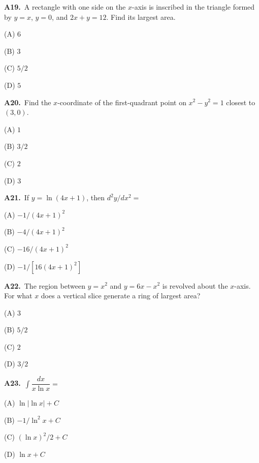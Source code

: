\documentclass[11pt]{article}
\begin{document}
\bigskip\noindent\textbf{A19.}\ A rectangle with one side on the $x$-axis is inscribed in the triangle formed by $y=x$, $y=0$, and $2x+y=12$. Find its largest area.
\begin{list}{}{\setlength{\leftmargin}{3em}\setlength{\labelwidth}{2.5em}\setlength{\itemsep}{0pt}\setlength{\topsep}{2pt}}
\item[(A)] $6$
\item[(B)] $3$
\item[(C)] $5/2$
\item[(D)] $5$
\end{list}

\bigskip\noindent\textbf{A20.}\ Find the $x$-coordinate of the first-quadrant point on $x^2-y^2=1$ closest to $(3,0)$.
\begin{list}{}{\setlength{\leftmargin}{3em}\setlength{\labelwidth}{2.5em}\setlength{\itemsep}{0pt}\setlength{\topsep}{2pt}}
\item[(A)] $1$
\item[(B)] $3/2$
\item[(C)] $2$
\item[(D)] $3$
\end{list}

\bigskip\noindent\textbf{A21.}\ If $y=\ln(4x+1)$, then $d^2y/dx^2=$
\begin{list}{}{\setlength{\leftmargin}{3em}\setlength{\labelwidth}{2.5em}\setlength{\itemsep}{0pt}\setlength{\topsep}{2pt}}
\item[(A)] $-1/(4x+1)^2$
\item[(B)] $-4/(4x+1)^2$
\item[(C)] $-16/(4x+1)^2$
\item[(D)] $-1/[16(4x+1)^2]$
\end{list}

\bigskip\noindent\textbf{A22.}\ The region between $y=x^2$ and $y=6x-x^2$ is revolved about the $x$-axis. For what $x$ does a vertical slice generate a ring of largest area?
\begin{list}{}{\setlength{\leftmargin}{3em}\setlength{\labelwidth}{2.5em}\setlength{\itemsep}{0pt}\setlength{\topsep}{2pt}}
\item[(A)] $3$
\item[(B)] $5/2$
\item[(C)] $2$
\item[(D)] $3/2$
\end{list}

\bigskip\noindent\textbf{A23.}\ $\int\dfrac{dx}{x\ln x}=$
\begin{list}{}{\setlength{\leftmargin}{3em}\setlength{\labelwidth}{2.5em}\setlength{\itemsep}{0pt}\setlength{\topsep}{2pt}}
\item[(A)] $\ln|\ln x|+C$
\item[(B)] $-1/\ln^2x+C$
\item[(C)] $(\ln x)^2/2+C$
\item[(D)] $\ln x+C$
\end{list}
\end{document}
